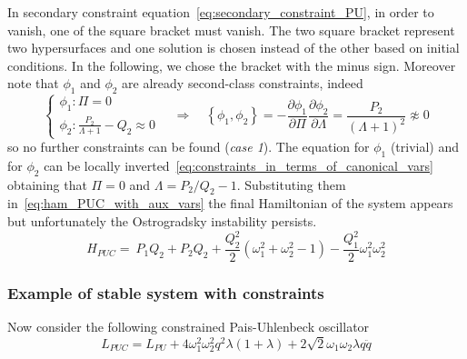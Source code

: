In secondary constraint equation~\eqref{eq:secondary_constraint_PU}, in order
to vanish, one of the square bracket must vanish. The two square bracket
represent two hypersurfaces and one solution is chosen instead of the other
based on initial conditions. In the following, we chose the bracket with the
minus sign. Moreover note that $\phi_1$ and $\phi_2$ are already second-class
constraints, indeed
\begin{equation*}
  \begin{cases}
    \phi_1: \Pi = 0 \\
    \phi_2: \frac{P_2}{\Lambda + 1} - Q_2 \approx 0
  \end{cases}
  \quad \Rightarrow \quad
  \left\{ \phi_1, \phi_2 \right\} = -
  \frac{\partial\phi_1}{\partial\Pi} \frac{\partial\phi_2}{\partial\Lambda} =
  \frac{P_2}{{(\Lambda + 1)}^2} \not\approx 0
\end{equation*}
so no further constraints can be found (\emph{case 1}). The equation for
$\phi_1$ (trivial) and for $\phi_2$ can be locally
inverted~\eqref{eq:constraints_in_terms_of_canonical_vars} obtaining that
$\Pi = 0$ and $\Lambda = P_2/Q_2 - 1$. Substituting them
in~\eqref{eq:ham_PUC_with_aux_vars} the final Hamiltonian of the system appears
but unfortunately the Ostrogradsky instability persists.
\begin{equation} \label{eq:ham_PUC_instable}
   H_{PUC} =\ P_1 Q_2 + P_2 Q_2
  + \frac{Q_2^2}{2} \left(\omega_1^2 + \omega_2^2 - 1 \right)
  - \frac{Q_1^2}{2} \omega_1^2 \omega_2^2
\end{equation}


\subsubsection{Example of stable system with constraints}
Now consider the following constrained Pais-Uhlenbeck oscillator~\cite{Chen13}
\begin{equation}
  L_{PUC} = L_{PU} +
  4 \omega_1^2\omega_2^2 q^2 \lambda (1+ \lambda) +
  2 \sqrt{2} \omega_1\omega_2 \lambda q \ddot{q}
\end{equation}

